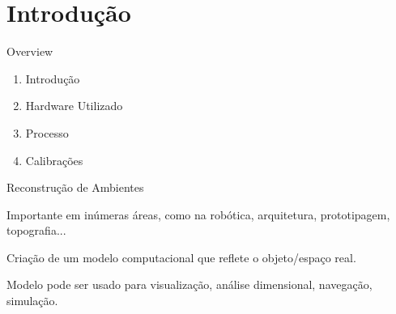 \section{Introdução}

\begin{frame}{Overview}

	\begin{enumerate}
		\item Introdução
		\item Hardware Utilizado
		\item Processo
		\item Calibrações
	\end{enumerate}

\end{frame}

\begin{frame}{Reconstrução de Ambientes}
    
    Importante em inúmeras áreas, como na robótica, arquitetura, prototipagem, topografia...
    
    Criação de um modelo computacional que reflete o objeto/espaço real.

    Modelo pode ser usado para visualização, análise dimensional, navegação, simulação.

\end{frame}